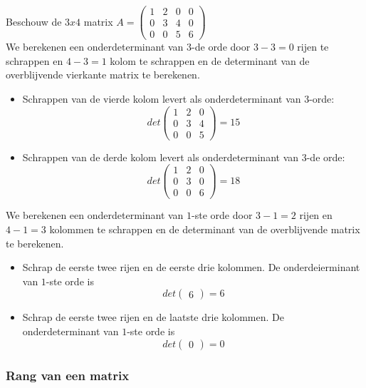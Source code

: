 Beschouw de $3x4$ matrix $A= \left( \begin{matrix} 1 & 2 & 0 & 0 \\ 0 & 3 & 4 & 0 \\ 0 & 0 & 5 & 6 \end{matrix} \right)$ \\
We berekenen een onderdeterminant van $3$-de orde door $3-3=0$ rijen te schrappen en $4-3=1$ kolom te schrappen en de determinant van de overblijvende vierkante matrix te berekenen.\\
\begin{itemize}
	\item Schrappen van de vierde kolom levert als onderdeterminant van $3$-orde:
	\[ det \left( \begin{matrix} 1 & 2 & 0 \\ 0 & 3 & 4 \\ 0 & 0 & 5 \end{matrix} \right)=15 \]
	\item Schrappen van de derde kolom levert als onderdeterminant van $3$-de orde:
	\[ det \left( \begin{matrix} 1 & 2 & 0 \\ 0 & 3 & 0 \\ 0 & 0 & 6 \end{matrix} \right)=18 \]
\end{itemize}

We berekenen een onderdeterminant van $1$-ste orde door $3-1=2$ rijen en $4-1=3$ kolommen te schrappen en de determinant van de overblijvende matrix te berekenen.\\
\begin{itemize}
	\item Schrap de eerste twee rijen en de eerste drie kolommen. De onderdeierminant van $1$-ste orde is
	\[  det \left( \begin{matrix} 6 \end{matrix} \right) =6 \]
	\item Schrap de eerste twee rijen en de laatste drie kolommen. De onderdeterminant van $1$-ste orde is
	\[  det \left( \begin{matrix} 0 \end{matrix} \right) =0 \]
\end{itemize}

\subsubsection{Rang van een matrix}

